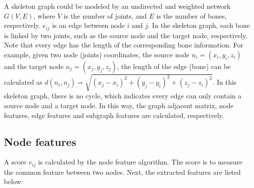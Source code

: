 \documentclass[journal]{IEEEtran}
\begin{document}
A skeleton graph could be modeled by an undirected and weighted network $G(V,E)$, where $V$ is the number of joints, and $E$ is the number of bones, respectively. $e_{ij}$ is an edge between node $i$ and $j$. In the skeleton graph, each bone is linked by two joints, such as the source node and the target node, respectively. Note that every edge has the length of the corresponding bone information. For example, given two node (joints) coordinates, the source node $n_i=(x_i,y_i,z_i)$ and the target node $n_j=(x_j,y_j,z_j)$, the length of the edge (bone) can be calculated as $d(n_i,n_j)=\sqrt{(x_j-x_i)^2+(y_j-y_i)^2+(z_j-z_i)^2}$. In this skeleton graph, there is no cycle, which indicates every edge can only contain a source node and a target node. In this way, the graph adjacent matrix, node features, edge features and subgraph features are calculated, respectively.

\subsection{Node features}

A score $v_{ij}$ is calculated by the node feature algorithm. The score is to measure the common feature between two nodes. Next, the extracted features are listed below:
\end{document}
